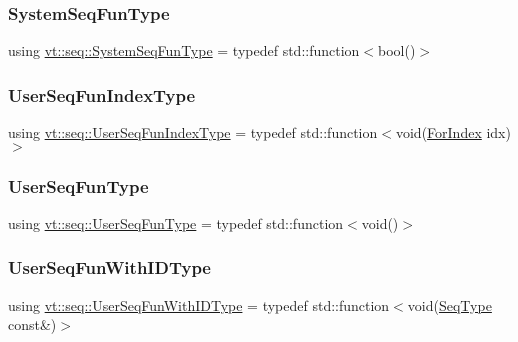 \subsubsection{\texorpdfstring{System\+Seq\+Fun\+Type}{SystemSeqFunType}}
{\footnotesize\ttfamily using \hyperlink{namespacevt_1_1seq_a80eeb50c74a4a3bd46fcf4d5213c5ebe}{vt\+::seq\+::\+System\+Seq\+Fun\+Type} = typedef std\+::function$<$bool()$>$}

\mbox{\label{namespacevt_1_1seq_ab8466502cdb46b9f1d17e3e5630ed65a}} 
\subsubsection{\texorpdfstring{User\+Seq\+Fun\+Index\+Type}{UserSeqFunIndexType}}
{\footnotesize\ttfamily using \hyperlink{namespacevt_1_1seq_ab8466502cdb46b9f1d17e3e5630ed65a}{vt\+::seq\+::\+User\+Seq\+Fun\+Index\+Type} = typedef std\+::function$<$void(\hyperlink{namespacevt_1_1seq_a6c570c39bac8f93bafe0bf8a0db8c798}{For\+Index} idx)$>$}

\mbox{\label{namespacevt_1_1seq_aeb4674d25dcb5d27248b68ec83fad2b6}} 
\subsubsection{\texorpdfstring{User\+Seq\+Fun\+Type}{UserSeqFunType}}
{\footnotesize\ttfamily using \hyperlink{namespacevt_1_1seq_aeb4674d25dcb5d27248b68ec83fad2b6}{vt\+::seq\+::\+User\+Seq\+Fun\+Type} = typedef std\+::function$<$void()$>$}

\mbox{\label{namespacevt_1_1seq_a1a58d0ebe1d6bbed8438607a9c717779}} 
\subsubsection{\texorpdfstring{User\+Seq\+Fun\+With\+I\+D\+Type}{UserSeqFunWithIDType}}
{\footnotesize\ttfamily using \hyperlink{namespacevt_1_1seq_a1a58d0ebe1d6bbed8438607a9c717779}{vt\+::seq\+::\+User\+Seq\+Fun\+With\+I\+D\+Type} = typedef std\+::function$<$void(\hyperlink{namespacevt_1_1seq_a3b612da217ac669d39c159f134ab8434}{Seq\+Type} const\&)$>$}



